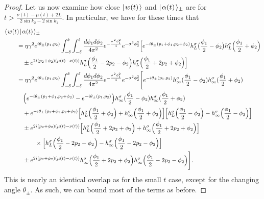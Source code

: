 \documentclass[../thesis-main/thesis-main]{subfiles}
\begin{document}
\begin{proof}
Let us now examine how close $|\mspace{2mu} w(t) \mspace{2mu} \rangle$ and $|\mspace{2mu} \alpha(t) \mspace{2mu} \rangle_\pm$ are for $t > \frac{\nu(t) - \mu(t) + 2L}{2\sin k_2 - 2 \sin k_1}$.  In particular, we have for these times that
\begin{align}
  &\langle\mspace{2mu} w(t) \mspace{2mu} | \mspace{2mu} \alpha(t)\mspace{2mu} \rangle_\pm \nonumber\\
  &\qquad= \eta \gamma^2 e^{i \theta_{\pm}(p_1,p_2)} \int_{-\delta}^\delta \int_{-\delta}^\delta \frac{d\phi_1 d \phi_2}{4\pi^2}  e^{-\frac{\sigma^2 \phi_1^2}{4}}  e^{- \sigma^2 \phi_2^2}\Big[e^{-i \theta_{\pm}(p_1 + \phi_1, p_2 + \phi_2)} h_L^\sigma \big(\frac{\phi_1}{2} - \phi_2 \big) h_L^\sigma\Big( \frac{\phi_1}{2} + \phi_2 \Big) \nonumber\\
  & \qquad \quad\pm e^{ 2 i( p_2 + \phi_2)(\mu(t) - \nu(t))} h_L^\sigma\Big(\frac{\phi_1}{2} - 2 p_2 - \phi_2\Big) h_L^\sigma\Big(\frac{\phi_1}{2}+ 2 p_2 + \phi_2\Big)\Big]\\
  & \qquad = \eta\gamma^2 e^{i \theta_{\pm}(p_1,p_2)}  \int_{-\delta}^\delta \int_{-\delta}^\delta \frac{d\phi_1 d\phi_2}{4\pi^2} e^{- \frac{\sigma^2 \phi_1^2}{4}}e^{-\sigma^2 \phi_2^2} \Bigg[ e^{-i \theta_{\pm}(p_1,p_2) }h_\infty^\sigma(\frac{\phi_1}{2} - \phi_{2} ) h_{\infty}^\sigma ( \frac{\phi_1}{2} + \phi_2) \nonumber\\
  &\qquad\quad \Big(e^{- i\theta_{\pm}(p_1 + \phi_1, p_2 + \phi_2)} - e^{- i \theta_{\pm}(p_1, p_2)}  \Big) h_\infty^\sigma(\frac{\phi_1}{2} - \phi_{2} ) h_{\infty}^\sigma ( \frac{\phi_1}{2} + \phi_2) \nonumber\\
 &\qquad \quad  + e^{- i\theta_{\pm}(p_1 + \phi_1, p_2 + \phi_2)} \Big[h_L^{\sigma} \Big(\frac{\phi_1}{2} + \phi_2 \Big)  + h_\infty^\sigma \Big(\frac{\phi_1}{2} + \phi_2 \Big)\Big] \Big[ h_{L}^\sigma\Big(\frac{\phi_1}{2} - \phi_2 \Big) - h_\infty^\sigma\Big(\frac{\phi_1}{2} - \phi_2\Big)\Big]\nonumber\\
   &\qquad \quad\pm  e^{ 2 i( p_2 + \phi_2)(\mu(t) - \nu(t))}  \Big[h_L^{\sigma} \Big(\frac{\phi_1}{2} + 2p_2 +\phi_2 \Big)  + h_\infty^\sigma \Big(\frac{\phi_1}{2} + 2p_2+ \phi_2 \Big)\Big] \nonumber\\
   &\qquad \quad \qquad \times\Big[ h_{L}^\sigma\Big(\frac{\phi_1}{2} -2p_2 - \phi_2 \Big) - h_\infty^\sigma\Big(\frac{\phi_1}{2} -2p_2- \phi_2\Big)\Big]\nonumber\\
   &\qquad \quad\pm  e^{ 2 i( p_2 + \phi_2)(\mu(t) - \nu(t))}h_\infty^{\sigma} \Big(\frac{\phi_1}{2} + 2p_2 +\phi_2 \Big) h_\infty^{\sigma} \Big(\frac{\phi_1}{2} - 2p_2 -\phi_2 \Big) \Bigg].
\end{align}
This is nearly an identical overlap as for the small $t$ case, except for the changing angle $\theta_\pm$.  As such, we can bound most of the terms as before.


\end{proof}
\end{document}
